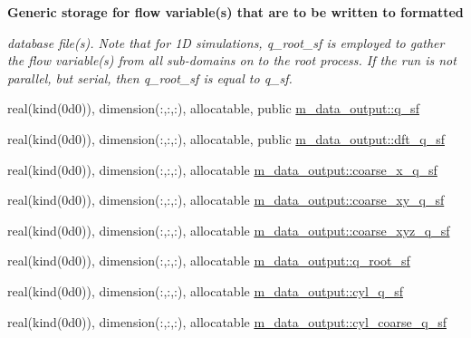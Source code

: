 \begin{Indent}\textbf{ Generic storage for flow variable(s) that are to be written to formatted}\par
{\em database file(s). Note that for 1D simulations, q\+\_\+root\+\_\+sf is employed to gather the flow variable(s) from all sub-\/domains on to the root process. If the run is not parallel, but serial, then q\+\_\+root\+\_\+sf is equal to q\+\_\+sf. }\begin{DoxyCompactItemize}
\item 
real(kind(0d0)), dimension(\+:,\+:,\+:), allocatable, public \hyperlink{namespacem__data__output_aa211f0ff6c5213825ff0d7fa0357ccef}{m\+\_\+data\+\_\+output\+::q\+\_\+sf}
\item 
real(kind(0d0)), dimension(\+:,\+:,\+:), allocatable, public \hyperlink{namespacem__data__output_a94a7c7e9bb108dc2d3360e1cd40d4909}{m\+\_\+data\+\_\+output\+::dft\+\_\+q\+\_\+sf}
\item 
real(kind(0d0)), dimension(\+:,\+:,\+:), allocatable \hyperlink{namespacem__data__output_a8a822ed22e0ffe582b2dc7f49109fa1d}{m\+\_\+data\+\_\+output\+::coarse\+\_\+x\+\_\+q\+\_\+sf}
\item 
real(kind(0d0)), dimension(\+:,\+:,\+:), allocatable \hyperlink{namespacem__data__output_a9d75551d2f262e079c3b6397404d5a79}{m\+\_\+data\+\_\+output\+::coarse\+\_\+xy\+\_\+q\+\_\+sf}
\item 
real(kind(0d0)), dimension(\+:,\+:,\+:), allocatable \hyperlink{namespacem__data__output_ac2d6c1c8ab5cc7a2762b462673086bbe}{m\+\_\+data\+\_\+output\+::coarse\+\_\+xyz\+\_\+q\+\_\+sf}
\item 
real(kind(0d0)), dimension(\+:,\+:,\+:), allocatable \hyperlink{namespacem__data__output_af74e742ddb67173d205d037902ce73f4}{m\+\_\+data\+\_\+output\+::q\+\_\+root\+\_\+sf}
\item 
real(kind(0d0)), dimension(\+:,\+:,\+:), allocatable \hyperlink{namespacem__data__output_a0a9ac4d26ce8ac2ea87cacf581b49692}{m\+\_\+data\+\_\+output\+::cyl\+\_\+q\+\_\+sf}
\item 
real(kind(0d0)), dimension(\+:,\+:,\+:), allocatable \hyperlink{namespacem__data__output_a6dbb29fcb50e8ca2140326f4ba85dd02}{m\+\_\+data\+\_\+output\+::cyl\+\_\+coarse\+\_\+q\+\_\+sf}
\end{DoxyCompactItemize}
\end{Indent}
